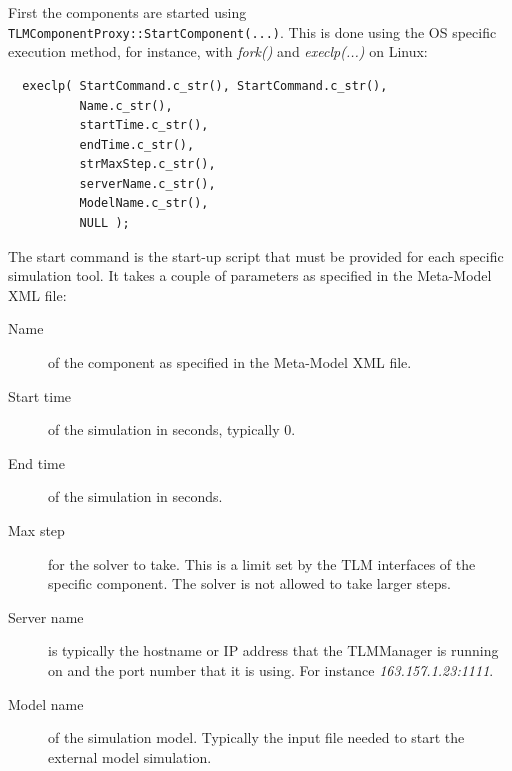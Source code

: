 First the components are started using {\tt
  TLMComponentProxy::StartComponent(...)}. This is done using the OS
specific execution method, for instance, with {\it fork()} and {\it
  execlp(...)} on Linux:
{\scriptsize
\begin{verbatim}
  execlp( StartCommand.c_str(), StartCommand.c_str(),
          Name.c_str(),
          startTime.c_str(),
          endTime.c_str(),
          strMaxStep.c_str(),
          serverName.c_str(),
          ModelName.c_str(),
          NULL );
\end{verbatim}
}

The start command is the start-up script that must be provided for each
specific simulation tool. It takes a couple of parameters as specified
in the Meta-Model XML file:
\begin{description}
\item[Name] of the component as specified in the Meta-Model XML file.
\item[Start time] of the simulation in seconds, typically 0.
\item[End time] of the simulation in seconds.
\item[Max step] for the solver to take. This is a limit set by the TLM
  interfaces of the specific component. The solver is not allowed to
  take larger steps.
\item[Server name] is typically the hostname or IP address that the
  TLMManager is running on and the port number that it is using. For
  instance {\it 163.157.1.23:1111}.
\item[Model name] of the simulation model. Typically the input file
  needed to start the external model simulation.
\end{description}

